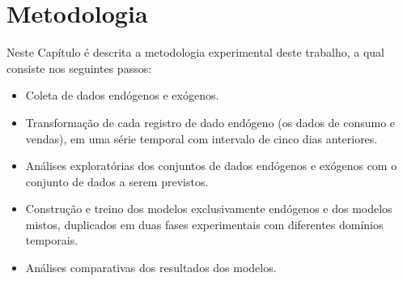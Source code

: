 
\chapter{Metodologia} \label{cap:metodos}





 
 
 
 
 
 
   Neste Capítulo é descrita a metodologia experimental deste trabalho, a qual consiste nos seguintes passos:
    \begin{itemize}
        \item Coleta de dados endógenos e exógenos.
        \item Transformação de cada registro de dado endógeno (os dados de consumo e vendas), em uma série temporal com intervalo de cinco dias anteriores.
        \item Análises exploratórias dos conjuntos de dados endógenos e exógenos com o conjunto de dados a serem previstos.
        \item Construção e treino dos modelos exclusivamente endógenos e dos modelos mistos, duplicados em duas fases experimentais com diferentes domínios temporais.
        \item Análises comparativas dos resultados dos modelos.
    \end{itemize}
    
